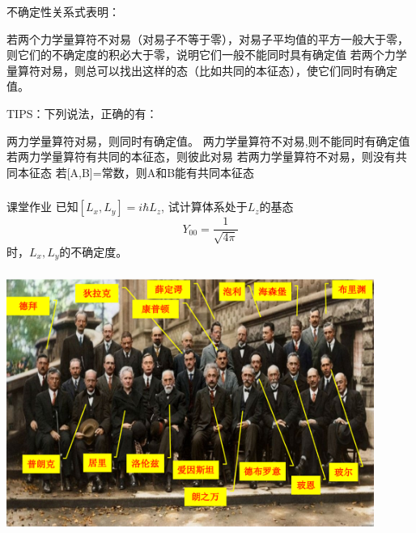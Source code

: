 \begin{frame} [allowframebreaks=]
    \begin{tcolorbox2}{不确定性关系式表明：}
    \begin{itemize}
        \Item 若两个力学量算符不对易（对易子不等于零），对易子平均值的平方一般大于零，则它们的不确定度的积必大于零，说明它们一般不能同时具有确定值
        \Item 若两个力学量算符对易，则总可以找出这样的态（比如共同的本征态），使它们同时有确定值。 
    \end{itemize}   
    \end{tcolorbox2}
\end{frame} 

\begin{frame} [allowframebreaks=]
    TIPS：下列说法，正确的有：
    \begin{enumerate}
        \Item 两力学量算符对易，则同时有确定值。 
        \Item 两力学量算符不对易,则不能同时有确定值 
        \Item 若两力学量算符有共同的本征态，则彼此对易
        \Item 若两力学量算符不对易，则没有共同本征态
        \Item 若[A,B]=常数，则A和B能有共同本征态
    \end{enumerate} 
\end{frame} 

\begin{frame} 
    \frametitle{}
    \begin{tcolorbox2}{课堂作业}
    已知$[L_x, L_y]=i\hbar L_z$, 试计算体系处于$L_z$的基态 $$Y_{00}=\frac{1}{\sqrt{4\pi}}$$时，$L_x, L_y$的不确定度。
    \end{tcolorbox2}
\end{frame} 

\begin{frame} 
    \frametitle{}
    \includegraphics[width=0.9\textwidth]{figs/meet.png}
\end{frame} 

